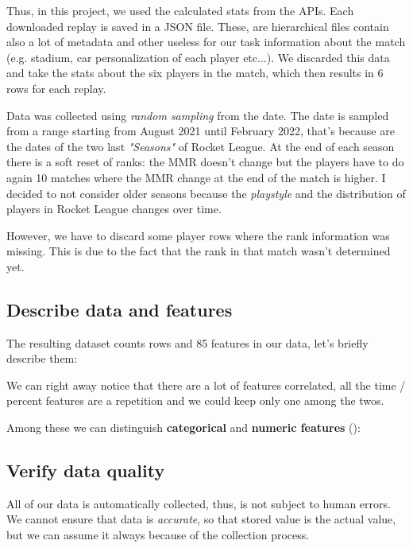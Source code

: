 Thus, in this project, we used the calculated stats from the APIs. Each downloaded replay is saved in a JSON file. These, are hierarchical files contain also a lot of metadata and other useless for our task information about the match (e.g. stadium, car personalization of each player etc...). We discarded this data and take the stats about the six players in the match, which then results in 6 rows for each replay.

Data was collected using \textit{random sampling} from the date. The date is sampled from a range starting from August 2021 until February 2022, that's because are the dates of the two last \textit{"Seasons"} of Rocket League. At the end of each season there is a soft reset of ranks: the MMR doesn't change but the players have to do again 10 matches where the MMR change at the end of the match is higher.
I decided to not consider older seasons because the \textit{playstyle} and the distribution of players in Rocket League changes over time.

However, we have to discard some player rows where the rank information was missing. This is due to the fact that the rank in that match wasn't determined yet.

\subsection{Describe data and features}

The resulting dataset counts  rows and 85 features in our data, let's briefly describe them:



We can right away notice that there are a lot of features correlated, all the time / percent features are a repetition and we could keep only one among the twos.

Among these we can distinguish \textbf{categorical} and \textbf{numeric features} ():



\subsection{Verify data quality}

All of our data is automatically collected, thus, is not subject to human errors.
We cannot ensure that data is \textit{accurate}, so that stored value is the actual value, but we can assume it always because of the collection process.

